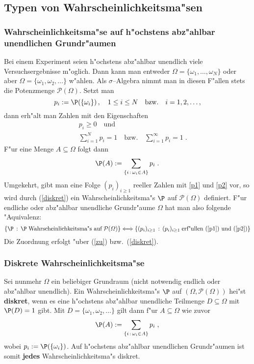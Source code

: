 \documentclass[ngerman,draft,parskip=half,twoside]{scrartcl}
\newcommand*{\PotM}{\mathcal{P}}    %
\begin{document}
\subsection{Typen von Wahrscheinlichkeitsma"sen}
\subsubsection{Wahrscheinlichkeitsma"se auf h"ochstens abz"ahlbar unendlichen Grundr"aumen}
Bei einem Experiment seien h"ochstens abz"ahlbar unendlich viele Versuchsergebnisse
m"oglich. Dann kann man entweder $\Omega=\{\omega_1,\ldots,\omega_N\}$ oder
aber $\Omega=\{\omega_1,\omega_2,\ldots\}$ w"ahlen. Als $\sigma$--Algebra nimmt man in diesen
F"allen stets die Potenzmenge $\PotM(\Omega)$. Setzt man
\begin{equation}
\label{zu}
p_i :=\P(\{\omega_i\})\,,\quad 1\le i\le N\quad\mbox{bzw.}\quad i=1,2,\ldots,
\end{equation}
dann erh"alt man Zahlen mit den Eigenschaften
\begin{eqnarray}
\label{p1}
&&p_i\ge 0\quad \mbox{und}\\
\label{p2}
&&\sum_{i=1}^N p_i =1\quad \mbox{bzw.}\quad \sum_{i=1}^\infty p_i =1\;.
\end{eqnarray}
F"ur eine Menge $A\subseteq \Omega$ folgt dann
\begin{equation}
\label{diskret}
\P(A):= \sum_{\{i\, : \,\omega_i\in A\}} p_i\;.
\end{equation}
Umgekehrt, gibt man eine Folge $(p_i)_{i\ge 1}$ reeller Zahlen mit \eqref{p1} und \eqref{p2} vor,
so wird durch (\ref{diskret}) ein Wahrscheinlichkeitsma"s $\P$ auf $\PotM(\Omega)$ definiert. F"ur
endliche oder abz"ahlbar unendliche Grundr"aume $\Omega$ hat man also folgende "Aquivalenz$\colon$
$$
\{\P\,:\,\P\;\mbox{Wahrscheinlichkeitsma"s auf}\;\PotM(\Omega)\}
\Longleftrightarrow\{(p_i)_{i\ge 1}\,:\, (p_i)_{i\ge 1}\;\mbox{erf"ullen (\ref{p1}) und (\ref{p2})}\}
$$
Die Zuordnung erfolgt "uber (\ref{zu}) bzw.~(\ref{diskret}).

\subsubsection{Diskrete Wahrscheinlichkeitsma"se}
Sei nunmehr $\Omega$ ein beliebiger Grundraum (nicht notwendig endlich
oder abz"ahlbar unendlich). Ein Wahrscheinlichkeitsma"s $\P$ auf $(\Omega,\PotM(\Omega))$
hei"st \textbf{diskret}, wenn es eine h"ochstens abz"ahlbar unendliche Teilmenge $D\subseteq \Omega$
mit $\P(D)=1$ gibt. Mit $D=\{\omega_1,\omega_2,\ldots\}$ gilt dann f"ur $A\subseteq \Omega$ wie zuvor
$$
\P(A):= \sum_{\{i\, : \,\omega_i\in A\}} p_i\;,
$$
wobei $p_i:=\P(\{\omega_i\})$. Auf h"ochstens abz"ahlbar unendlichen Grundr"aumen ist somit \textbf{jedes}
Wahrscheinlichkeitsma"s diskret.
\end{document}
